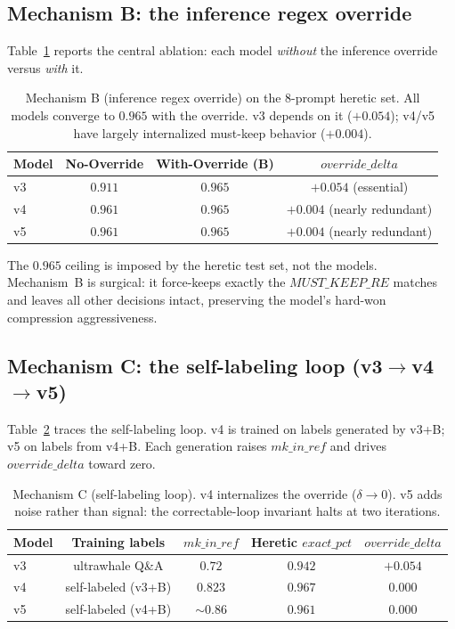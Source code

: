 \subsection{Mechanism B: the inference regex override}
\label{sec:eval:B}

Table~\ref{tab:override} reports the central ablation: each model
\emph{without} the inference override versus \emph{with} it.

\begin{table}[h]
\centering
\caption{Mechanism B (inference regex override) on the 8-prompt heretic set.
All models converge to $0.965$ with the override. v3 depends on it
($+0.054$); v4/v5 have largely internalized must-keep behavior ($+0.004$).}
\label{tab:override}
\begin{tabular}{lccc}
\toprule
Model & No-Override & With-Override (B) & $\mathit{override\_delta}$ \\
\midrule
v3 & $0.911$ & $\mathbf{0.965}$ & $+0.054$ (essential) \\
v4 & $0.961$ & $\mathbf{0.965}$ & $+0.004$ (nearly redundant) \\
v5 & $0.961$ & $\mathbf{0.965}$ & $+0.004$ (nearly redundant) \\
\bottomrule
\end{tabular}
\end{table}

The $0.965$ ceiling is imposed by the heretic test set, not the models.
Mechanism~B is surgical: it force-keeps exactly the
$\mathit{MUST\_KEEP\_RE}$ matches and leaves all other decisions intact,
preserving the model's hard-won compression aggressiveness.

\subsection{Mechanism C: the self-labeling loop (v3$\to$v4$\to$v5)}
\label{sec:eval:C}

Table~\ref{tab:selflabel} traces the self-labeling loop. v4 is trained on
labels generated by v3+B; v5 on labels from v4+B. Each generation raises
$\mathit{mk\_in\_ref}$ and drives $\mathit{override\_delta}$ toward zero.

\begin{table}[h]
\centering
\caption{Mechanism C (self-labeling loop). v4 internalizes the override
($\delta\to0$). v5 adds noise rather than signal: the correctable-loop
invariant halts at two iterations.}
\label{tab:selflabel}
\begin{tabular}{lcccc}
\toprule
Model & Training labels & $\mathit{mk\_in\_ref}$ & Heretic $\mathit{exact\_pct}$ & $\mathit{override\_delta}$ \\
\midrule
v3 & ultrawhale Q\&A         & $0.72$  & $0.942$ & $+0.054$ \\
v4 & self-labeled (v3+B)    & $0.823$ & $\mathbf{0.967}$ & $\mathbf{0.000}$ \\
v5 & self-labeled (v4+B)    & ${\sim}0.86$ & $0.961$ & $0.000$ \\
\bottomrule
\end{tabular}
\end{table}

